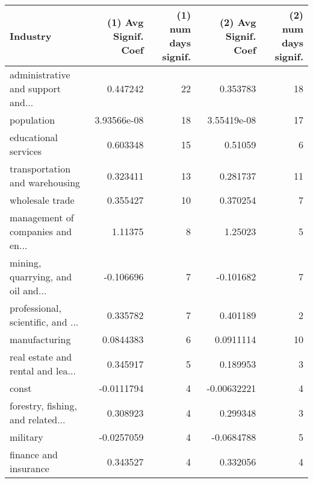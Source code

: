\begin{tabular}{lrrrr}
\hline
 Industry                          &   (1) Avg Signif. Coef &   (1) num days signif. &   (2) Avg Signif. Coef &   (2) num days signif. \\
\hline
 administrative and support and... &            0.447242    &                     22 &            0.353783    &                     18 \\
 population                        &            3.93566e-08 &                     18 &            3.55419e-08 &                     17 \\
 educational services              &            0.603348    &                     15 &            0.51059     &                      6 \\
 transportation and warehousing    &            0.323411    &                     13 &            0.281737    &                     11 \\
 wholesale trade                   &            0.355427    &                     10 &            0.370254    &                      7 \\
 management of companies and en... &            1.11375     &                      8 &            1.25023     &                      5 \\
 mining, quarrying, and oil and... &           -0.106696    &                      7 &           -0.101682    &                      7 \\
 professional, scientific, and ... &            0.335782    &                      7 &            0.401189    &                      2 \\
 manufacturing                     &            0.0844383   &                      6 &            0.0911114   &                     10 \\
 real estate and rental and lea... &            0.345917    &                      5 &            0.189953    &                      3 \\
 const                             &           -0.0111794   &                      4 &           -0.00632221  &                      4 \\
 forestry, fishing, and related... &            0.308923    &                      4 &            0.299348    &                      3 \\
 military                          &           -0.0257059   &                      4 &           -0.0684788   &                      5 \\
 finance and insurance             &            0.343527    &                      4 &            0.332056    &                      4 \\

\end{tabular}
